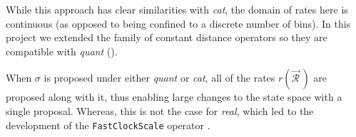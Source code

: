 \documentclass[10pt,letterpaper]{article}
\begin{document}
While this approach has clear similarities with \textit{cat}, the domain of rates here is continuous (as opposed to being confined to a discrete number of bins).
In this project we extended the family of constant distance operators  \cite{zhang2020improving} so they are compatible with \textit{quant} (\textbf{}). 


When $\sigma$ is proposed under either \textit{quant} or \textit{cat}, all of the rates $r(\vec{\mathcal{R}}^{\,})$ are proposed along with it, thus enabling large changes to the state space with a single proposal.
Whereas, this is not the case for \textit{real}, which led to the development of the \texttt{FastClockScale} operator \cite{zhang2020improving}. 














\end{document}
